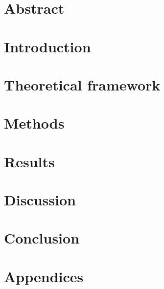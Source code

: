\documentclass[a4paper,12pt,twoside]{article}
\begin{document}
\pagestyle{body}




\newpage

%  

\section*{Abstract}

\newpage

\pagestyle{body}

\section{Introduction}

\newpage

\section{Theoretical framework}

\newpage

\section{Methods}

\newpage

\section{Results}

\newpage

\section{Discussion}

\newpage

\section{Conclusion}

\newpage

\pagestyle{contents}



\newpage

\section*{Appendices}

\end{document}
